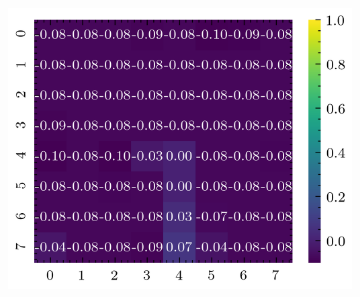 \documentclass[../document.tex]{subfiles}
\begin{document}
\begin{figure}[H]
\begin{subfigure}[b]{0.19\textwidth}
        \includegraphics[width=\linewidth]{../img/5/quarry/false_positive/heatmap-2d-4.png}
    \end{subfigure}  


\end{figure}
\end{document}
